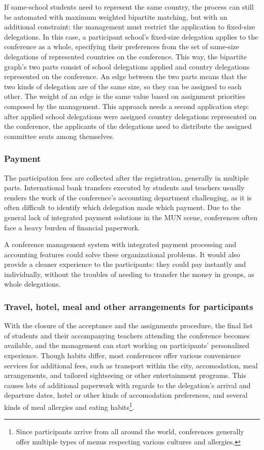 If same-school students need to represent the same country, the process can still be automated with maximum weighted bipartite matching, but with an additional constraint: the management must restrict the application to fixed-size delegations. In this case, a participant school's fixed-size delegation applies to the conference as a whole, specifying their preferences from the set of same-size delegations of represented countries on the conference. This way, the bipartite graph's two parts consist of school delegations applied and country delegations represented on the conference. An edge between the two parts means that the two kinds of delegation are of the same size, so they can be assigned to each other. The weight of an edge is the same  value based on assignment priorities composed by the management. This approach needs a second application step: after applied school delegations were assigned country delegations represented on the conference, the applicants of the delegations need to distribute the assigned committee seats among themselves.

\subsubsection{Payment}

The participation fees are collected after the registration, generally in multiple parts. International bank transfers executed by students and teachers usually renders the work of the conference's accounting department challenging, as it is often difficult to identify which delegation made which payment. Due to the general lack of integrated payment solutions in the MUN scene, conferences often face a heavy burden of financial paperwork.

A conference management system with integrated payment processing and accounting features could solve these organizational problems. It would also provide a cleaner experience to the participants: they could pay instantly and individually, without the troubles of needing to transfer the money in groups, as whole delegations.

\subsubsection{Travel, hotel, meal and other arrangements for participants}

With the closure of the acceptance and the assignments procedure, the final list of students and their accompanying teachers attending the conference becomes available, and the management can start working on participants' personalized experience. Though habits differ, most conferences offer various convenience services for additional fees, such as transport within the city, accomodation, meal arrangements, and tailored sightseeing or other entertainment programs. This causes lots of additional paperwork with regards to the delegation's arrival and departure dates, hotel or other kinds of accomodation preferences, and several kinds of meal allergies and eating habits\footnote{Since participants arrive from all around the world, conferences generally offer multiple types of menus respecting various cultures and allergies.}.

